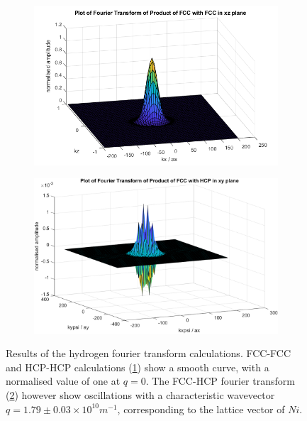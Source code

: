\begin{figure}[htbp]
    \centering
    \begin{subfigure}{0.45\linewidth}
        \centering
        \includegraphics[width= 0.9\linewidth]{Figures/Model/Plot of fourier transform of the wavefunction fccfcc xz plane.png}
        \label{fig:diagonal hydrogen matrix element no oscillation}
    \end{subfigure}
    \hfill
    \begin{subfigure}{0.45\linewidth}
        \centering
        \includegraphics[width= 0.9\linewidth]{Figures/Model/Plot of fourier transform of the wavefunction.png}
        \label{fig:cross hydrogen matrix element oscillation}
    \end{subfigure}
    \caption{Results of the hydrogen fourier transform calculations.
    FCC-FCC and HCP-HCP calculations
    (\cref{fig:diagonal hydrogen matrix element no oscillation})
    show a smooth curve, with a normalised
    value of one at \(q=0\).
    The FCC-HCP fourier transform
    (\cref{fig:cross hydrogen matrix element oscillation})
    however show oscillations with a characteristic
    wavevector \(q = 1.79 \pm 0.03 \times{}10^{10}m^{-1}\),
    corresponding to the lattice vector of \(Ni\).}\label{fig:fourier transform oscillation}
\end{figure}
